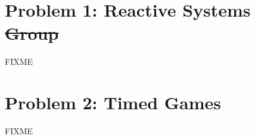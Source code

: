 \documentclass[a4paper,parskip,headheight=38pt]{scrartcl} %
\begin{document}
\section*{Problem 1: Reactive Systems \sout{Group}}

FIXME


\section*{Problem 2: Timed Games}

FIXME
\end{document}
